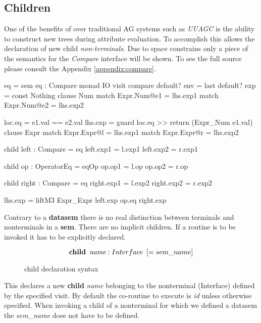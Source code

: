 \subsection{Children}
One of the benefits of \rcore over traditional AG systems such as \emph{UUAGC} is the ability to construct new trees during attribute evaluation. To accomplish this \rcore allows the declaration of new child \emph{non-terminals}. Due to space constrains only a piece of the semantics for the \emph{Compare} interface will be shown. To see the full source please consult the Appendix \ref{appendix:compare}.

\begin{code}
eq = sem eq : Compare monad IO
       visit compare
         default? env = last
         default? exp = const Nothing
         clause Num
           match Expr.Num@e1 = lhs.exp1
           match Expr.Num@e2 = lhs.exp2
           
           loc.eq  = e1.val == e2.val
           lhs.exp = guard loc.eq >> return (Expr_Num e1.val)
         clause Expr
           match Expr.Expr@l = lhs.exp1
           match Expr.Expr@r = lhs.exp2
           
           child left : Compare = eq
           left.exp1 = l.exp1
           left.exp2 = r.exp1
           
           child op : OperatorEq = eqOp
           op.op1 = l.op
           op.op2 = r.op
           
           child right : Compare = eq
           right.exp1 = l.exp2
           right.exp2 = r.exp2
           
           lhs.exp = liftM3 Expr_Expr left.exp op.eq right.exp
\end{code}

Contrary to a \textbf{datasem} there is no real distinction between terminals and nonterminals in a \textbf{sem}. There are no implicit children. If a routine is to be invoked it has to be explicitly declared.

\begin{figure}[h!]
\[
\textbf{child} \hspace{5pt} \emph{name} : Interface \hspace{5pt} [= sem\_name]
\]
\caption{child declaration syntax}
\end{figure}

This declares a new \textbf{child} \emph{name} belonging to the nonterminal (Interface) defined by the specified visit\cite{visitag}. By default the co-routine to execute is \emph{id} unless otherwise specified. When invoking a child of a nonterminal for which we defined a datasem the \emph{sem\_name} does not have to be defined.


